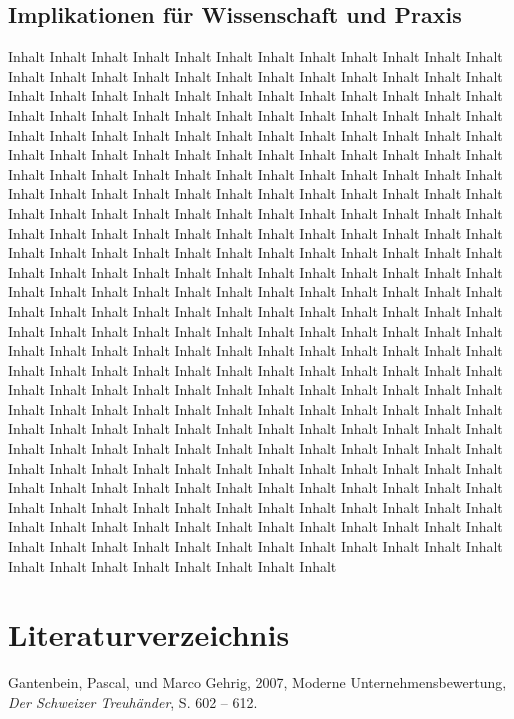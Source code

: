 \documentclass[11pt,a4paper,titlepage]{scrartcl}
\begin{document}
\subsection{Implikationen für Wissenschaft und Praxis}
Inhalt Inhalt Inhalt Inhalt Inhalt Inhalt Inhalt Inhalt Inhalt Inhalt Inhalt Inhalt Inhalt Inhalt Inhalt Inhalt Inhalt Inhalt Inhalt Inhalt Inhalt Inhalt Inhalt Inhalt Inhalt Inhalt Inhalt Inhalt Inhalt Inhalt Inhalt Inhalt Inhalt Inhalt Inhalt Inhalt Inhalt Inhalt Inhalt Inhalt Inhalt Inhalt Inhalt Inhalt Inhalt Inhalt Inhalt Inhalt Inhalt Inhalt Inhalt Inhalt Inhalt Inhalt Inhalt Inhalt Inhalt Inhalt Inhalt Inhalt Inhalt Inhalt Inhalt Inhalt Inhalt Inhalt Inhalt Inhalt Inhalt Inhalt Inhalt Inhalt Inhalt Inhalt Inhalt Inhalt Inhalt Inhalt Inhalt Inhalt Inhalt Inhalt Inhalt Inhalt Inhalt Inhalt Inhalt Inhalt Inhalt Inhalt Inhalt Inhalt Inhalt Inhalt Inhalt Inhalt Inhalt Inhalt Inhalt Inhalt Inhalt Inhalt Inhalt Inhalt Inhalt Inhalt Inhalt Inhalt Inhalt Inhalt Inhalt Inhalt Inhalt Inhalt Inhalt Inhalt Inhalt Inhalt Inhalt Inhalt Inhalt Inhalt Inhalt Inhalt Inhalt Inhalt Inhalt Inhalt Inhalt Inhalt Inhalt Inhalt Inhalt Inhalt Inhalt Inhalt Inhalt Inhalt Inhalt Inhalt Inhalt Inhalt Inhalt Inhalt Inhalt Inhalt Inhalt Inhalt Inhalt Inhalt Inhalt Inhalt Inhalt Inhalt Inhalt Inhalt Inhalt Inhalt Inhalt Inhalt Inhalt Inhalt Inhalt Inhalt Inhalt Inhalt Inhalt Inhalt Inhalt Inhalt Inhalt Inhalt Inhalt Inhalt Inhalt Inhalt Inhalt Inhalt Inhalt Inhalt Inhalt Inhalt Inhalt Inhalt Inhalt Inhalt Inhalt Inhalt Inhalt Inhalt Inhalt Inhalt Inhalt Inhalt Inhalt Inhalt Inhalt Inhalt Inhalt Inhalt Inhalt Inhalt Inhalt Inhalt Inhalt Inhalt Inhalt Inhalt Inhalt Inhalt Inhalt Inhalt Inhalt Inhalt Inhalt Inhalt Inhalt Inhalt Inhalt Inhalt Inhalt Inhalt Inhalt Inhalt Inhalt Inhalt Inhalt Inhalt Inhalt Inhalt Inhalt Inhalt Inhalt Inhalt Inhalt Inhalt Inhalt Inhalt Inhalt Inhalt Inhalt Inhalt Inhalt Inhalt Inhalt Inhalt Inhalt Inhalt Inhalt Inhalt Inhalt Inhalt Inhalt Inhalt Inhalt Inhalt Inhalt Inhalt Inhalt Inhalt Inhalt Inhalt Inhalt Inhalt Inhalt Inhalt Inhalt Inhalt Inhalt Inhalt Inhalt Inhalt Inhalt Inhalt Inhalt Inhalt Inhalt Inhalt Inhalt Inhalt Inhalt Inhalt Inhalt Inhalt Inhalt Inhalt Inhalt Inhalt Inhalt Inhalt Inhalt Inhalt Inhalt Inhalt Inhalt Inhalt Inhalt Inhalt Inhalt Inhalt Inhalt Inhalt Inhalt Inhalt Inhalt Inhalt Inhalt Inhalt Inhalt Inhalt Inhalt Inhalt Inhalt Inhalt Inhalt Inhalt Inhalt Inhalt Inhalt Inhalt 

\newpage
\section{Literaturverzeichnis}
Gantenbein, Pascal, und Marco Gehrig, 2007, Moderne Unternehmensbewertung, \textit{Der
Schweizer Treuhänder}, S. 602 – 612.
\end{document}
